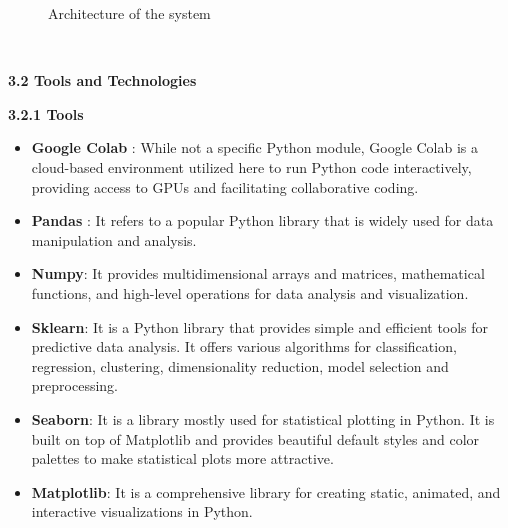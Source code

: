 \documentclass[12pt, English]{article}
\begin{document}
\begin{normalsize}
\begin{figure}[htb]
\begin{center}
\renewcommand{\thefigure}{3.1.1}
\caption{\footnotesize Architecture of the system}
\end{center}
\end{figure}\\

\begin{large}
\textbf{3.2 Tools and Technologies}\\
\end{large}
\begin{normalsize}
\textbf{3.2.1 Tools}
    \begin{itemize}
         \item \textbf{Google Colab }: While not a specific Python module, Google Colab is a cloud-based environment utilized here to run Python code interactively, providing access to GPUs and facilitating collaborative coding.
        \item \textbf{Pandas} : It refers to a popular Python library that is widely used for data manipulation and analysis.
        \item \textbf{Numpy}: It provides multidimensional arrays and matrices, mathematical functions, and high-level operations for data analysis and visualization.
        \item \textbf{Sklearn}: It is a Python library that provides simple and efficient tools for predictive data analysis. It offers various algorithms for classification, regression, clustering, dimensionality reduction, model selection and preprocessing.
        \item \textbf{Seaborn}: It is a library mostly used for statistical plotting in Python. It is built on top of Matplotlib and provides beautiful default styles and color palettes to make statistical plots more attractive.
        \item \textbf{Matplotlib}: It is a comprehensive library for creating static, animated, and interactive visualizations in Python.
     \end{itemize}
\end{normalsize}


\end{normalsize}
\end{document}
